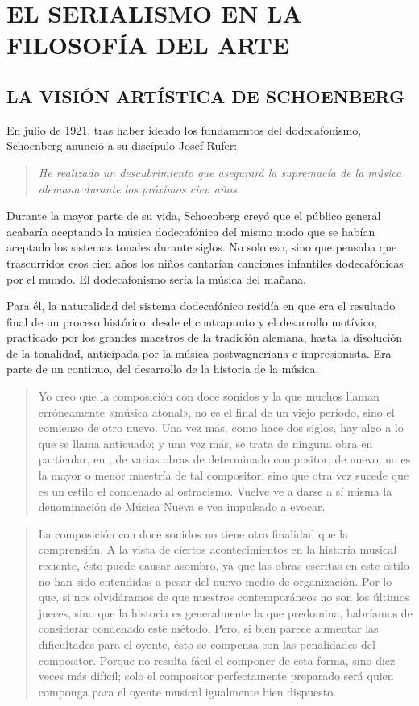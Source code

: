 	\chapter{EL SERIALISMO EN LA FILOSOFÍA DEL ARTE}
    \section{LA VISIÓN ARTÍSTICA DE SCHOENBERG}
    En julio de 1921, tras haber ideado los fundamentos del dodecafonismo, Schoenberg anunció a su discípulo Josef Rufer: \begin{quote}\emph{He realizado un descubrimiento que asegurará la supremacía de la música alemana durante los próximos cien años.}\end{quote}Durante la mayor parte de su vida, Schoenberg creyó que el público general acabaría aceptando la música dodecafónica del mismo modo que se habían aceptado los sistemas tonales durante siglos. No solo eso, sino que pensaba que trascurridos esos cien años los niños cantarían canciones infantiles dodecafónicas por el mundo. El dodecafonismo sería la música del mañana.
    
    Para él, la naturalidad del sistema dodecafónico residía en que era el resultado final de un proceso histórico: desde el contrapunto y el desarrollo motívico, practicado por los grandes maestros de la tradición alemana, hasta la disolución de la tonalidad, anticipada por la música postwagneriana e impresionista. Era parte de un continuo, del desarrollo de la historia de la música.
    
    \begin{quote}
    	Yo creo que la composición con doce sonidos y la que muchos llaman erróneamente «música atonal», no es el final de un viejo período, sino el comienzo de otro nuevo. Una vez más, como hace dos siglos, hay algo a lo que se llama anticuado; y una vez más, se trata de ninguna obra en particular, en , de varias obras de determinado compositor; de nuevo, no es la mayor o menor maestría de tal compositor, sino que otra vez sucede que es un estilo el condenado al ostracismo. Vuelve ve a darse a sí misma la denominación de Música Nueva e vea impulsado a evocar.
    \end{quote}

	\begin{quote}
		La composición con doce sonidos no tiene otra finalidad que la comprensión. A la vista de ciertos acontecimientos en la historia musical reciente, ésto puede causar asombro, ya que las obras escritas en este estilo no han sido entendidas a pesar del nuevo medio de organización. Por lo que, si nos olvidáramos de que nuestros contemporáneos no son los últimos jueces, sino que la historia es generalmente la que predomina, habríamos de considerar condenado este método. Pero, si bien parece aumentar las dificultades para el oyente, ésto se compensa con las penalidades del compositor. Porque no resulta fácil el componer de esta forma, sino diez veces más difícil; solo el compositor perfectamente preparado será quien componga para el oyente musical igualmente bien dispuesto.
	\end{quote}
    
